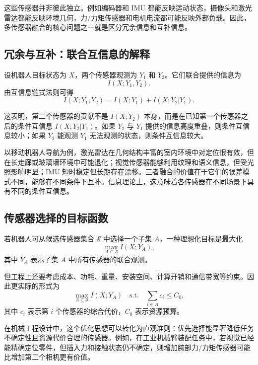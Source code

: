 \documentclass[UTF8,a4paper,12pt]{ctexart}
\begin{document}
这些传感器并非彼此独立。例如编码器和 IMU 都能反映运动状态，摄像头和激光雷达都能反映环境几何，力/力矩传感器和电机电流都可能反映外部负载。因此，多传感器融合的核心问题之一就是区分冗余信息和互补信息。

\subsection{冗余与互补：联合互信息的解释}

设机器人目标状态为 $X$，两个传感器观测为 $Y_1$ 和 $Y_2$。它们联合提供的信息为
\begin{equation}
I(X;Y_1,Y_2).
\end{equation}
由互信息链式法则可得
\begin{equation}
I(X;Y_1,Y_2)=I(X;Y_1)+I(X;Y_2|Y_1).
\end{equation}

这表明，第二个传感器的贡献不是 $I(X;Y_2)$ 本身，而是在已知第一个传感器之后的条件互信息 $I(X;Y_2|Y_1)$。如果 $Y_2$ 与 $Y_1$ 提供的信息高度重叠，则条件互信息较小；如果 $Y_2$ 能观测 $Y_1$ 无法观测的状态，则条件互信息较大。

以移动机器人导航为例，激光雷达在几何结构丰富的室内环境中对定位很有效，但在长走廊或玻璃墙环境中可能退化；视觉传感器能够利用纹理和语义信息，但受光照影响明显；IMU 短时稳定但长期存在漂移。三者融合的价值在于它们的误差模式不同，能够在不同条件下互补。信息理论上，这意味着各传感器在不同场景下具有不同的条件互信息。

\subsection{传感器选择的目标函数}

若机器人可从候选传感器集合 $\mathcal{S}$ 中选择一个子集 $A$，一种理想化目标是最大化
\begin{equation}
\max_{A\subseteq \mathcal{S}} I(X;Y_A),
\end{equation}
其中 $Y_A$ 表示子集 $A$ 中所有传感器的联合观测。

但工程上还要考虑成本、功耗、重量、安装空间、计算开销和通信带宽等约束。因此更实际的形式为
\begin{equation}
\max_{A\subseteq \mathcal{S}} I(X;Y_A)
\quad
\text{s.t.}\quad
\sum_{i\in A} c_i \le C_0,
\end{equation}
其中 $c_i$ 表示第 $i$ 个传感器的综合代价，$C_0$ 表示资源预算。

在机械工程设计中，这个优化思想可以转化为直观准则：优先选择能显著降低任务不确定性且资源代价合理的传感器。例如，在工业机械臂装配任务中，若视觉已经能精确定位零件，但插入力和接触状态仍不确定，则增加腕部力/力矩传感器可能比增加第二个相机更有价值。
\end{document}
